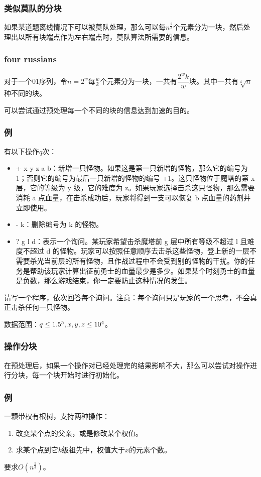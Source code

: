 \documentclass[10pt]{beamer}
\begin{document}
	\begin{frame}
		\frametitle{类似莫队的分块}
	
		如果某道题离线情况下可以被莫队处理，那么可以每$n^{\frac 23}$个元素分为一块，然后处理出以所有块端点作为左右端点时，莫队算法所需要的信息。
	
	\end{frame}
	\begin{frame}
		\frametitle{four russians}

		对于一个$01$序列，令$n=2^w$每$\frac wk$个元素分为一块，一共有$\dfrac{2^{w}k}{w}$块。其中一共有$\sqrt[k] n$种不同的块。

		可以尝试通过预处理每一个不同的块的信息达到加速的目的。
	
	\end{frame}
	\begin{frame}
		\frametitle{例}
	
		有以下操作$q$次：

		\begin{itemize}
			\item + x y z a b：新增一只怪物。如果这是第一只新增的怪物，那么它的编号为 1；否则它的编号为最后一只新增的怪物的编号 +1。这只怪物位于魔塔的第 x 层，它的等级为 y 级，它的难度为 z。如果玩家选择击杀这只怪物，那么需要消耗 a 点血量，在击杀成功后，玩家将得到一支可以恢复 b 点血量的药剂并立即使用。
			\item - k：删除编号为 k 的怪物。
			\item ? g l d：表示一个询问。某玩家希望击杀魔塔前 g 层中所有等级不超过 l 且难度不超过 d 的怪物。玩家可以按照任意顺序去击杀这些怪物，登上新的一层不需要杀光当前层的所有怪物，且作战过程中不会受到别的怪物的干扰。你的任务是帮助该玩家计算出征前勇士的血量最少是多少。如果某个时刻勇士的血量是负数，那么游戏结束，你一定要防止这种情况的发生。
		\end{itemize}

		请写一个程序，依次回答每个询问。注意：每个询问只是玩家的一个思考，不会真正击杀任何一只怪物。

		数据范围：$q\le 1.5\time 10^5,x,y,z\le 10^4$。
		
	\end{frame}
	\begin{frame}
		\frametitle{操作分块}
	
		在预处理后，如果一个操作对已经处理完的结果影响不大，那么可以尝试对操作进行分块，每一个块开始时进行初始化。
	
	\end{frame}
	\begin{frame}
		\frametitle{例}
	
		一颗带权有根树，支持两种操作：

		\begin{enumerate}
			\item 改变某个点的父亲，或是修改某个权值。
			\item 求某个点到它$k$级祖先中，权值大于$x$的元素个数。
		\end{enumerate}

		要求$O(n^{\frac 53})$。
	
	\end{frame}
\end{document}
